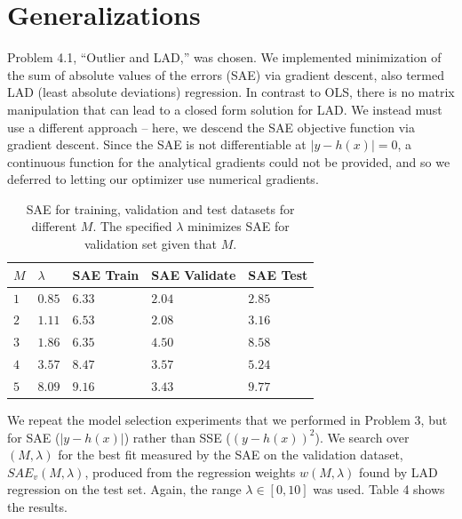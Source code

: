 \documentclass[10pt]{article}
\begin{document}
\section{Generalizations}
Problem 4.1, ``Outlier and LAD,'' was chosen.  We implemented minimization of the sum of absolute values of the errors (SAE) via gradient descent, also termed LAD (least absolute deviations) regression.  In contrast to OLS, there is no matrix manipulation that can lead to a closed form solution for LAD.  We instead must use a different approach -- here, we descend the SAE objective function via gradient descent.  Since the SAE is not differentiable at $| y - h(x)|=0$, a continuous function for the analytical gradients could not be provided, and so we deferred to letting our optimizer use numerical gradients.

\begin{table}
\begin{tabular}{|l|l|l|l|l|}
\hline 
$M$ & $\lambda$ & SAE Train & SAE Validate & SAE Test \\ \hline
$1$ & $0.85$ & $6.33$ & $2.04$ & $2.85$ \\ \hline
$2$ & $1.11$ & $6.53$ & $2.08$ & $3.16$ \\ \hline
$3$ & $1.86$ & $6.35$ & $4.50$ & $8.58$ \\ \hline
$4$ & $3.57$ & $8.47$ & $3.57$ & $5.24$ \\ \hline
$5$ & $8.09$ & $9.16$ & $3.43$ & $9.77$ \\
\hline
\end{tabular}
\label{tableSAE}
\caption{SAE for training, validation and test datasets for different $M$. The specified $\lambda$ minimizes SAE for validation set given that $M$.}
\end{table}

We repeat the model selection experiments that we performed in Problem 3, but for SAE ($|y-h(x)|$) rather than SSE ($(y-h(x))^2$). We search over $(M,\lambda)$ for the best fit measured by the SAE on the validation dataset, $SAE_v(M,\lambda)$, produced from the regression weights $w(M,\lambda)$ found by LAD regression on the test set.  Again, the range $\lambda \in [0,10]$ was used. Table 4 shows the results.  
\end{document}
